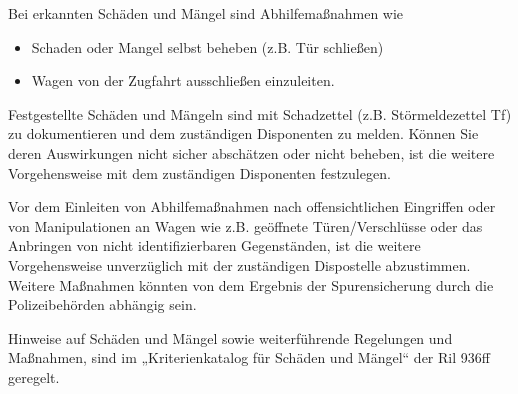 Bei erkannten Schäden und Mängel sind Abhilfemaßnahmen wie
\begin{itemize}
    \item Schaden oder Mangel selbst beheben (z.B. Tür schließen)
    \item Wagen von der Zugfahrt ausschließen einzuleiten.
\end{itemize}
Festgestellte Schäden und Mängeln sind mit Schadzettel (z.B. Störmeldezettel Tf) zu dokumentieren und dem zuständigen Disponenten zu melden. Können Sie deren Auswirkungen nicht sicher abschätzen oder nicht beheben, ist die weitere Vorgehensweise mit dem zuständigen Disponenten festzulegen.\par
Vor dem Einleiten von Abhilfemaßnahmen nach offensichtlichen Eingriffen oder von Manipulationen an Wagen wie z.B. geöffnete Türen/Verschlüsse oder das Anbringen
von nicht identifizierbaren Gegenständen, ist die weitere Vorgehensweise unverzüglich mit der zuständigen Dispostelle abzustimmen. Weitere Maßnahmen könnten von dem Ergebnis der Spurensicherung durch die Polizeibehörden abhängig sein. \par
Hinweise auf Schäden und Mängel sowie weiterführende Regelungen und Maßnahmen, sind im „Kriterienkatalog für Schäden und Mängel“ der Ril 936ff geregelt.\par
